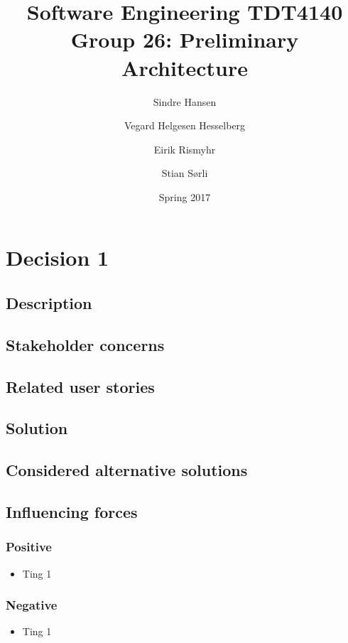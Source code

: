 \documentclass[12pt, a4paper]{article}
\title{Software Engineering TDT4140 \\ Group 26: Preliminary Architecture}
\author{Sindre Hansen \and Vegard Helgesen Hesselberg \and Eirik Rismyhr \and Stian Sørli}
\date{Spring 2017}
\begin{document}
\maketitle
\tableofcontents
\thispagestyle{empty}
\clearpage
\setcounter{page}{1}
\section{Decision 1}
\subsection{Description}

\subsection{Stakeholder concerns}

\subsection{Related user stories}

\subsection{Solution}

\subsection{Considered alternative solutions}

\subsection{Influencing forces}
\begin{minipage}{0.5\textwidth}
    \subsubsection*{Positive}
    \begin{itemize}
        \item Ting 1
    \end{itemize}
\end{minipage}%
\begin{minipage}{0.5\textwidth}
    \subsubsection*{Negative}
    \begin{itemize}
        \item Ting 1
    \end{itemize}
\end{minipage}
\end{document}
